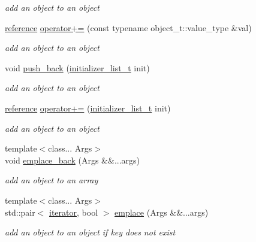 \begin{DoxyCompactItemize}
\begin{DoxyCompactList}\small\item\em add an object to an object \end{DoxyCompactList}\item 
\hyperlink{classnlohmann_1_1basic__json_ac6a5eddd156c776ac75ff54cfe54a5bc}{reference} \hyperlink{classnlohmann_1_1basic__json_abf04978d85a2d5c4754f4806d42f46fd}{operator+=} (const typename object\+\_\+t\+::value\+\_\+type \&val)
\begin{DoxyCompactList}\small\item\em add an object to an object \end{DoxyCompactList}\item 
void \hyperlink{classnlohmann_1_1basic__json_a1be31ef2d2934d37a818083a4af44f99}{push\+\_\+back} (\hyperlink{classnlohmann_1_1basic__json_a670f6a0eb3d1e0ffd00c27d35472ccc9}{initializer\+\_\+list\+\_\+t} init)
\begin{DoxyCompactList}\small\item\em add an object to an object \end{DoxyCompactList}\item 
\hyperlink{classnlohmann_1_1basic__json_ac6a5eddd156c776ac75ff54cfe54a5bc}{reference} \hyperlink{classnlohmann_1_1basic__json_af245c2b6714d76ed99a2d02f2596d596}{operator+=} (\hyperlink{classnlohmann_1_1basic__json_a670f6a0eb3d1e0ffd00c27d35472ccc9}{initializer\+\_\+list\+\_\+t} init)
\begin{DoxyCompactList}\small\item\em add an object to an object \end{DoxyCompactList}\item 
{\footnotesize template$<$class... Args$>$ }\\void \hyperlink{classnlohmann_1_1basic__json_ade45be7a74af7aa2d447e555d48e39ea}{emplace\+\_\+back} (Args \&\&...args)
\begin{DoxyCompactList}\small\item\em add an object to an array \end{DoxyCompactList}\item 
{\footnotesize template$<$class... Args$>$ }\\std\+::pair$<$ \hyperlink{classnlohmann_1_1basic__json_a099316232c76c034030a38faa6e34dca}{iterator}, bool $>$ \hyperlink{classnlohmann_1_1basic__json_ab515108f8219ac33256a48066bbc7354}{emplace} (Args \&\&...args)
\begin{DoxyCompactList}\small\item\em add an object to an object if key does not exist \end{DoxyCompactList}\item 

\end{DoxyCompactItemize}
